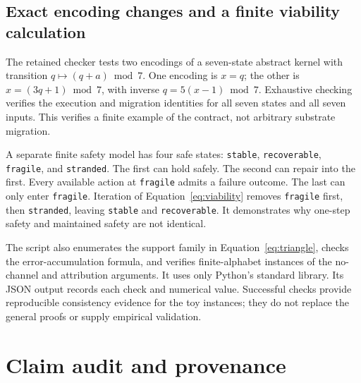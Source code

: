\documentclass[11pt,a4paper]{article}
\theoremstyle{definition}
\theoremstyle{remark}
\begin{document}
\subsection{Exact encoding changes and a finite viability calculation}
The retained checker tests two encodings of a seven-state abstract kernel with transition $q\mapsto(q+a)\bmod7$. One encoding is $x=q$; the other is $x=(3q+1)\bmod7$, with inverse $q=5(x-1)\bmod7$. Exhaustive checking verifies the execution and migration identities for all seven states and all seven inputs. This verifies a finite example of the contract, not arbitrary substrate migration.

A separate finite safety model has four safe states: \texttt{stable}, \texttt{recoverable}, \texttt{fragile}, and \texttt{stranded}. The first can hold safely. The second can repair into the first. Every available action at \texttt{fragile} admits a failure outcome. The last can only enter \texttt{fragile}. Iteration of Equation~\eqref{eq:viability} removes \texttt{fragile} first, then \texttt{stranded}, leaving \texttt{stable} and \texttt{recoverable}. It demonstrates why one-step safety and maintained safety are not identical.

The script also enumerates the support family in Equation~\eqref{eq:triangle}, checks the error-accumulation formula, and verifies finite-alphabet instances of the no-channel and attribution arguments. It uses only Python's standard library. Its JSON output records each check and numerical value. Successful checks provide reproducible consistency evidence for the toy instances; they do not replace the general proofs or supply empirical validation.

\Needspace{0.18\textheight}





\Needspace{0.18\textheight}

\section{Claim audit and provenance}\label{app:audit}

\end{document}
